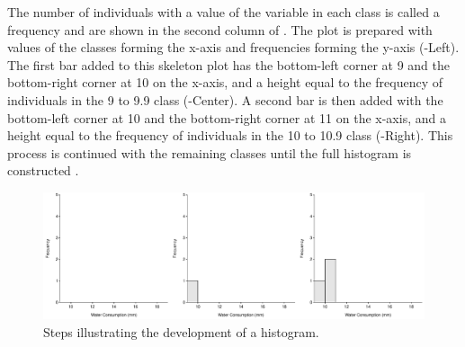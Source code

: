 \documentclass[10pt,openany]{book}\usepackage[]{graphicx}\usepackage[]{color}
\newenvironment{knitrout}{}{} %
\begin{document}
The number of individuals with a value of the variable in each class is called a frequency and are shown in the second column of . The plot is prepared with values of the classes forming the x-axis and frequencies forming the y-axis (-Left).  The first bar added to this skeleton plot has the bottom-left corner at 9 and the bottom-right corner at 10 on the x-axis, and a height equal to the frequency of individuals in the 9 to 9.9 class (-Center).  A second bar is then added with the bottom-left corner at 10 and the bottom-right corner at 11 on the x-axis, and a height equal to the frequency of individuals in the 10 to 10.9 class (-Right).  This process is continued with the remaining classes until the full histogram is constructed .

\begin{knitrout}
\color{fgcolor}\begin{figure}[hbtp]

{\centering \includegraphics[width=.95\linewidth]{Figs/MouseHist1-1} 

}

\caption[Steps illustrating the development of a histogram]{Steps illustrating the development of a histogram.}\label{fig:MouseHist1}
\end{figure}


\end{knitrout}

\vspace{24pt}  %
\end{document}
